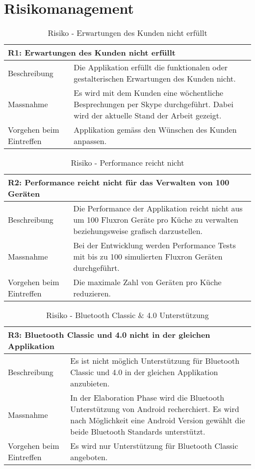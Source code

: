 
\section{Risikomanagement}
\label{sec:Risikomanagement}

\begin{table}[H]
\begin{tabularx}{\textwidth}{l|>{\raggedright\arraybackslash}X}
\multicolumn{2}{l}{\textbf{R1: Erwartungen des Kunden nicht erfüllt }} \\
\hline
Beschreibung & Die Applikation erfüllt die funktionalen oder gestalterischen Erwartungen des Kunden nicht.\\
\hline
Massnahme & Es wird mit dem Kunden eine wöchentliche Besprechungen per Skype durchgeführt. Dabei wird der aktuelle Stand der Arbeit gezeigt.\\
\hline
Vorgehen beim Eintreffen & Applikation gemäss den Wünschen des Kunden anpassen.
\\
\end{tabularx}
\caption{Risiko - Erwartungen des Kunden nicht erfüllt}
\end{table}

\begin{table}[H]
\begin{tabularx}{\textwidth}{l|>{\raggedright\arraybackslash}X}
\multicolumn{2}{l}{\textbf{R2: Performance reicht nicht für das Verwalten von 100 Geräten }} \\
\hline
Beschreibung & Die Performance der Applikation reicht nicht aus um 100 Fluxron Geräte pro Küche zu verwalten beziehungsweise grafisch darzustellen.\\
\hline
Massnahme & Bei der Entwicklung werden Performance Tests mit bis zu 100 simulierten Fluxron Geräten durchgeführt.\\
\hline
Vorgehen beim Eintreffen & Die maximale Zahl von Geräten pro Küche reduzieren.
\\
\end{tabularx}
\caption{Risiko - Performance reicht nicht}
\end{table}

\begin{table}[H]
\begin{tabularx}{\textwidth}{l|>{\raggedright\arraybackslash}X}
\multicolumn{2}{l}{\textbf{R3: Bluetooth Classic und 4.0 nicht in der gleichen Applikation }} \\
\hline
Beschreibung & Es ist nicht möglich Unterstützung für Bluetooth Classic und 4.0 in der gleichen Applikation anzubieten.\\
\hline
Massnahme & In der Elaboration Phase wird die Bluetooth Unterstützung von Android recherchiert. Es wird nach Möglichkeit eine Android Version gewählt die beide Bluetooth Standards unterstützt.\\
\hline
Vorgehen beim Eintreffen & Es wird nur Unterstützung für Bluetooth Classic angeboten.
\\
\end{tabularx}
\caption{Risiko - Bluetooth Classic \& 4.0 Unterstützung}
\end{table}